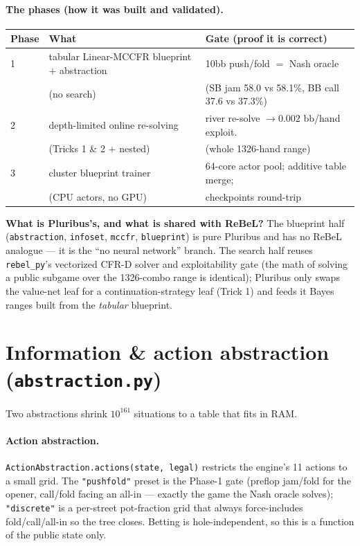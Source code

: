 \documentclass[11pt,a4paper]{article}
\newcommand{\file}[1]{\textcolor{accent}{\texttt{#1}}}
\newcommand{\fn}[1]{\texttt{#1}}
\begin{document}
\paragraph{The phases (how it was built and validated).}
\begin{center}\small
\begin{tabular}{@{}lll@{}}
\toprule
Phase & What & Gate (proof it is correct) \\
\midrule
1 & tabular Linear-MCCFR blueprint $+$ abstraction & 10bb push/fold $=$ Nash oracle \\
  &  (no search) & (SB jam 58.0 vs 58.1\%, BB call 37.6 vs 37.3\%) \\
2 & depth-limited online re-solving & river re-solve $\to 0.002$ bb/hand exploit. \\
  &  (Tricks 1 \& 2 $+$ nested) & (whole 1326-hand range) \\
3 & cluster blueprint trainer & 64-core actor pool; additive table merge; \\
  &  (CPU actors, no GPU) & checkpoints round-trip \\
\bottomrule
\end{tabular}
\end{center}

\begin{intuition}
\textbf{What is Pluribus's, and what is shared with ReBeL?} The blueprint half
(\file{abstraction}, \file{infoset}, \file{mccfr}, \file{blueprint}) is pure
Pluribus and has no ReBeL analogue --- it is the ``no neural network'' branch.
The search half reuses \file{rebel\_py}'s vectorized CFR-D solver and
exploitability gate (the math of solving a public subgame over the 1326-combo
range is identical); Pluribus only swaps the value-net leaf for a
continuation-strategy leaf (Trick 1) and feeds it Bayes ranges built from the
\emph{tabular} blueprint.
\end{intuition}

\section{Information \& action abstraction (\file{abstraction.py})}

Two abstractions shrink $10^{161}$ situations to a table that fits in RAM.

\paragraph{Action abstraction.} \fn{ActionAbstraction.actions(state, legal)}
restricts the engine's 11 actions to a small grid. The \texttt{"pushfold"} preset
is the Phase-1 gate (preflop jam/fold for the opener, call/fold facing an all-in
--- exactly the game the Nash oracle solves); \texttt{"discrete"} is a per-street
pot-fraction grid that always force-includes fold/call/all-in so the tree closes.
Betting is hole-independent, so this is a function of the public state only.
\end{document}
